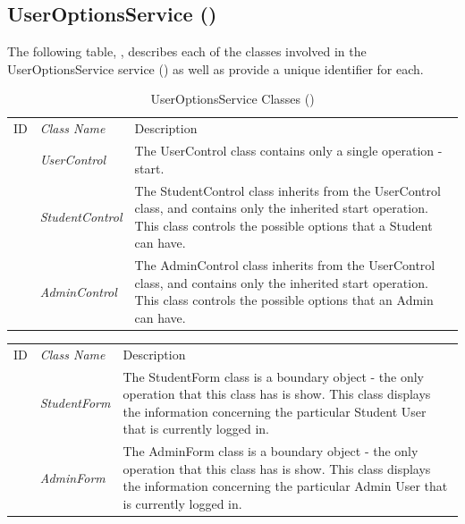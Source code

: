\documentclass[12pt,letterpaper]{article}
\begin{document}
\subsection{UserOptionsService ()}

The following table, , describes each of the classes involved in the UserOptionsService service () as well as provide a unique identifier for each.
\begin{table}[H]
	\caption{UserOptionsService Classes ()} 
	\begin{tabu} to 
	    \tableheader{}ID & Class Name & Description \\
	     & UserControl & The UserControl class contains only a single operation - start.\\
	     & StudentControl & The StudentControl class inherits from the UserControl class, and contains only the inherited start operation. This class controls the possible options that a Student can have.\\
	     & AdminControl & The AdminControl class inherits from the UserControl class, and contains only the inherited start operation. This class controls the possible options that an Admin can have. \\
	\end{tabu}
\end{table}

\begin{center}
\begin{tabu} to 
	    \tableheader{}ID & Class Name & Description \\
	 & StudentForm & The StudentForm class is a boundary object - the only operation that this class has is show. This class displays the information concerning the particular Student User that is currently logged in.\\
	     & AdminForm & The AdminForm class is a boundary object - the only operation that this class has is show. This class displays the information concerning the particular Admin User that is currently logged in.\\
	\end{tabu}
\end{center}
\end{document}
